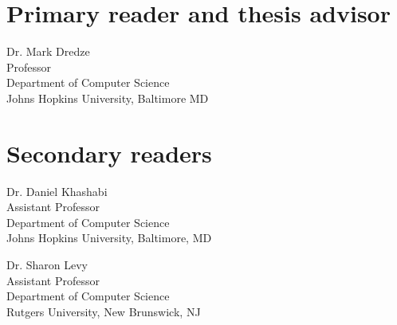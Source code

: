 \begin{singlespace}

    \section*{Primary reader and thesis advisor}
    
    Dr. Mark Dredze \\
    Professor\\
    Department of Computer Science\\
    Johns Hopkins University, Baltimore MD 


    \section*{Secondary readers}
    
    Dr. Daniel Khashabi\\
    Assistant Professor\\
    Department of Computer Science \\
    Johns Hopkins University, Baltimore, MD 
    
    \vspace{0.1in}
    
    Dr. Sharon Levy \\
    Assistant Professor\\
    Department of Computer Science \\
    Rutgers University, New Brunswick, NJ



\end{singlespace}